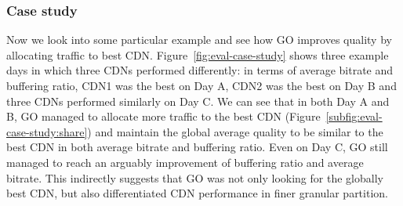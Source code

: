 \begin{figure}[t!]
\centering
{}
\label{fig:perf-impr}
\end{figure}


\subsubsection{Case study}
Now we look into some particular example and see how GO improves quality by allocating traffic to best CDN. Figure~\ref{fig:eval-case-study} shows three example days in which three CDNs performed differently: in terms of average bitrate and buffering ratio, CDN1 was the best on Day A, CDN2 was the best on Day B and three CDNs performed similarly on Day C. We can see that in both Day A and B, GO managed to allocate more traffic to the best CDN (Figure~\ref{subfig:eval-case-study:share}) and maintain the global average quality to be similar to the best CDN in both average bitrate and buffering ratio. Even on Day C, GO still managed to reach an arguably improvement of buffering ratio and average bitrate. This indirectly suggests that GO was not only looking for the globally best CDN, but also differentiated CDN performance in finer granular partition.


